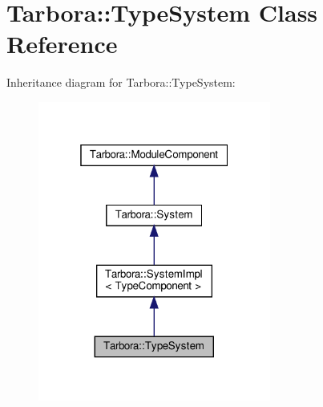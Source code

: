 \hypertarget{classTarbora_1_1TypeSystem}{}\section{Tarbora\+:\+:Type\+System Class Reference}
\label{classTarbora_1_1TypeSystem}


Inheritance diagram for Tarbora\+:\+:Type\+System\+:
\nopagebreak
\begin{figure}[H]
\begin{center}
\leavevmode
\includegraphics[width=217pt]{classTarbora_1_1TypeSystem__inherit__graph}
\end{center}
\end{figure}


